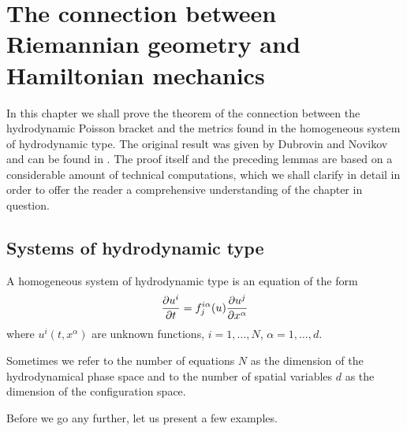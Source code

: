 \chapter{The connection between Riemannian geometry and Hamiltonian mechanics}

In this chapter we shall prove the theorem of the connection between the hydrodynamic Poisson bracket and the metrics found in the homogeneous system of hydrodynamic type. The original result was given by Dubrovin and Novikov and can be found in \cite{Dubrovin-Novikov}. The proof itself and the preceding lemmas are based on a considerable amount of technical computations, which we shall clarify in detail in order to offer the reader a comprehensive understanding of the chapter in question.





\section{Systems of hydrodynamic type}

\begin{definition}
    A homogeneous system of hydrodynamic type is an equation of the form
    \begin{align}
        \label{eq:h-system}
        \frac{\partial u^i}{\partial t} = f_j^{i \alpha} (u) \frac{\partial u^j}{\partial x^\alpha} 
    \end{align}
    where $u^i(t,x^\alpha)$ are unknown functions, $i = 1, \dots , N$, $\alpha = 1, \dots , d$.
\end{definition}

Sometimes we refer to the number of equations $N$ as the dimension of the hydrodynamical phase space and to the number of spatial variables $d$ as the dimension of the configuration space.

Before we go any further, let us present a few examples.

